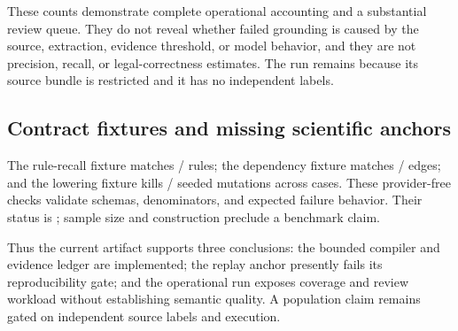 These counts demonstrate complete operational accounting and a substantial
review queue. They do not reveal whether failed grounding is caused by the
source, extraction, evidence threshold, or model behavior, and they are not
precision, recall, or legal-correctness estimates. The run remains
 because its source bundle is restricted and
it has no independent labels.

\subsection{Contract fixtures and missing scientific anchors}

The rule-recall fixture matches \RuleRecallMatched{}/\RuleRecallGold{} rules;
the dependency fixture matches \DependencyMatched{}/\DependencyGold{} edges;
and the lowering fixture kills \MutationKilled{}/\MutationTotal{} seeded
mutations across \MutationCases{} cases. These provider-free checks validate
schemas, denominators, and expected failure behavior. Their status is
; sample size and construction preclude a
benchmark claim.



Thus the current artifact supports three conclusions: the bounded compiler and
evidence ledger are implemented; the replay anchor presently fails its
reproducibility gate; and the operational run exposes coverage and review
workload without establishing semantic quality. A population claim remains
gated on independent source labels and execution.

